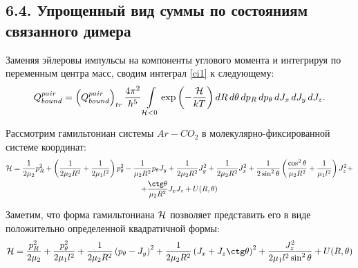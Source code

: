 \subsection*{\textbf{6.4.} Упрощенный вид суммы по состояниям связанного димера}

Заменяя эйлеровы импульсы на компоненты углового момента и интегрируя по переменным центра масс, сводим интеграл \eqref{ci1} к следующему:
\vverh
\begin{gather}
	Q_{bound}^{pair} = \left( Q_{bound}^{pair} \right)_{tr} \frac{4 \pi^2}{h^5} \int\limits_{\mathcal{H} < 0} \exp \left( - \frac{\mathcal{H}}{kT} \right) d R \, d \theta \, d p_R \, d p_\theta \, d J_x \, d J_y \, d J_z. \notag
\end{gather}

Рассмотрим гамильтониан системы $Ar-CO_2$ в молекулярно-фиксированной системе координат:
\begin{gather}
	\mH = \frac{1}{2 \mu_2} p_R^2 + \lb \frac{1}{2 \mu_2 R^2} + \frac{1}{2 \mu_1 l^2} \rb p_\theta^2 - \frac{1}{\mu_2 R^2} p_\theta J_y + \frac{1}{2 \mu_2 R^2} J_y^2 + \frac{1}{2 \mu_2 R^2} J_x^2 + \frac{1}{2 \sin^2 \theta} \lb \frac{\cos^2 \theta}{\mu_2 R^2} + \frac{1}{\mu_1 l^2} \rb J_z^2 + \notag \\
+ \frac{\ctg \theta}{\mu_2 R^2} J_x J_z + U(R, \theta) \notag
\end{gather}

Заметим, что форма гамильтониана $\mathcal{H}$ позволяет представить его в виде положительно определенной квадратичной формы:
\begin{gather}
	\mH = \frac{p_R^2}{2 \mu_2} + \frac{p_\theta^2}{2 \mu_1 l^2} + \frac{1}{2 \mu_2 R^2} \lb p_\theta - J_y \rb^2 + \frac{1}{2 \mu_2 R^2} \lb J_x + J_z \ctg \theta \rb^2 + \frac{J_z^2}{2 \mu_1 l^2 \sin^2 \theta} + U(R, \theta) \notag
\end{gather}


